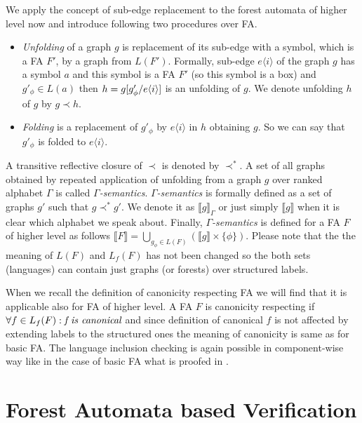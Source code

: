 We apply the concept of sub-edge replacement to the forest automata of higher level now
and introduce following two procedures over FA.
\begin{itemize}
	\item \emph{Unfolding} of a graph $g$ is replacement of its sub-edge with a symbol, which is
		a FA $F'$, by a graph from $L(F')$.
		Formally, sub-edge $e\langle i \rangle$ of the graph $g$ has a symbol $a$ and this symbol is a FA $F'$ (so this symbol is a box)
		and $g'_\phi \in L(a)$ then $h = g [g'_\phi/e\langle i \rangle]$ is an unfolding of $g$.
		We denote unfolding $h$ of $g$ by $g \prec h$.
	\item \emph{Folding} is a replacement of $g'_\phi$ by $e \langle i \rangle$ in $h$ obtaining $g$.
		So we can say that $g'_\phi$ is folded to $e \langle i \rangle$. 
\end{itemize}

A transitive reflective closure of $\prec$ is denoted by $\prec^*$.
A set of all graphs obtained by repeated application of unfolding from
a graph $g$ over ranked alphabet $\Gamma$ is called \emph{$\Gamma$-semantics}. 
\emph{$\Gamma$-semantics} is formally defined as a set of graphs $g'$ such that $g \prec^* g'$.
We denote it as $\llbracket g \rrbracket_\Gamma$ or just simply $\llbracket g \rrbracket$ when it is
clear which alphabet we speak about.
Finally, \emph{$\Gamma$-semantics} is defined for a FA $F$ of higher level as follows $\llbracket F \rrbracket = \bigcup_{g_\phi \in L(F)} (\llbracket g \rrbracket \times \{\phi\})$.
Please note that the the meaning of $L(F)$ and $L_f(F)$ has not been changed so the both sets (languages) can contain just graphs (or forests)
over structured labels.

When we recall the definition of canonicity respecting FA we will find that it is applicable also for FA of higher level.
A FA $F$ is canonicity respecting if $\forall f \in L_f(F): \emph{f is canonical}$ and since definition of canonical $f$
is not affected by extending labels to the structured ones the meaning of canonicity is same as for basic FA.
The language inclusion checking is again possible in component-wise way like in the case of basic FA what is
proofed in \cite{forester:techrep}.


\chapter{Forest Automata based Verification}
\label{ch:fav}

